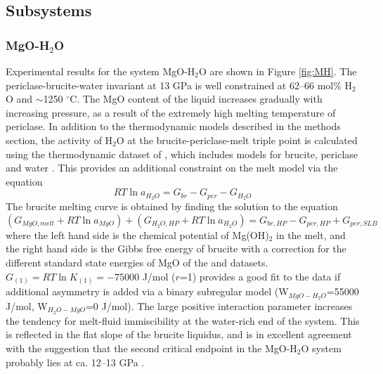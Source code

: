 \documentclass[review]{elsarticle}
\begin{document}
\subsection{Subsystems}
\subsubsection{MgO-H$_2$O}
Experimental results for the system MgO-H$_2$O are shown in Figure \ref{fig:MH}. The periclase-brucite-water invariant at 13 GPa is well constrained at 62--66 mol\% H$_2$O and $\sim$1250 $^{\circ}$C. The MgO content of the liquid increases gradually with increasing pressure, as a result of the extremely high melting temperature of periclase. In addition to the thermodynamic models described in the methods section, the activity of H$_2$O at the brucite-periclase-melt triple point is calculated using the thermodynamic dataset of \citep{HP2011}, which includes models for brucite, periclase and water \citep{PS1995}. This provides an additional constraint on the melt model via the equation
\begin{equation}
RT \ln a_{H_2O} =  G_{br} - G_{per} - G_{H_2O}
\end{equation}
The brucite melting curve is obtained by finding the solution to the equation
\begin{equation}
(G_{MgO, melt} + RT \ln a_{MgO}) + (G_{H_2O, HP} + RT \ln a_{H_2O}) = G_{br, HP} - G_{per, HP} + G_{per, SLB}
\end{equation}
\noindent where the left hand side is the chemical potential of Mg(OH)$_2$ in the melt, and the right hand side is the Gibbs free energy of brucite with a correction for the different standard state energies of MgO of the \cite{HP2011} and \cite{SLB2011} datasets. $G_{(1)} = RT \ln K_{(1)} = -75000$ J/mol ($r$=1) provides a good fit to the data if additional asymmetry is added via a binary subregular model (W$_{MgO-H_2O}$=55000 J/mol, W$_{H_2O-MgO}$=0 J/mol). The large positive interaction parameter increases the tendency for melt-fluid immiscibility at the water-rich end of the system. This is reflected in the flat slope of the brucite liquidus, and is in excellent agreement with the suggestion that the second critical endpoint in the MgO-H$_2$O system probably lies at ca. 12--13 GPa \citep{MSUP2007}.
\end{document}
